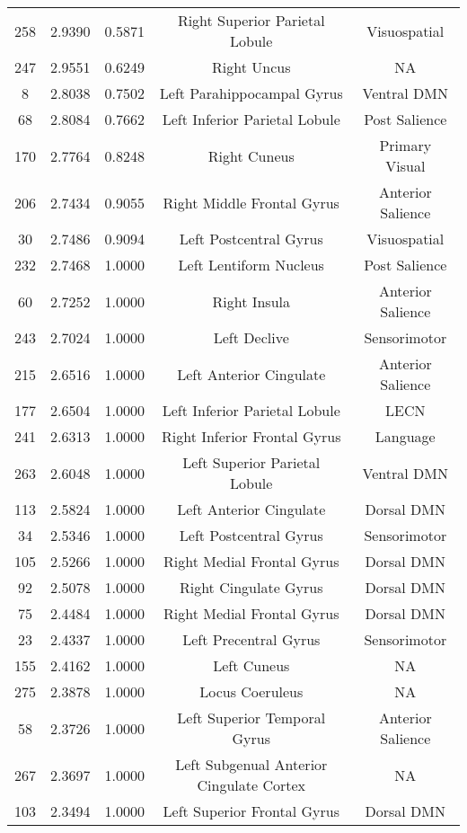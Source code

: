 \documentclass[10pt,letterpaper]{article}\usepackage[]{graphicx}\usepackage[]{color}
\begin{document}
\begin{center}
\begin{longtable}[c]{ccccc}
	258	& 2.9390 & 0.5871 & Right Superior Parietal Lobule & Visuospatial \\
	247	& 2.9551 & 0.6249 & Right Uncus & NA \\
	8	& 2.8038 & 0.7502 & Left Parahippocampal Gyrus & Ventral DMN \\
	68	& 2.8084 & 0.7662 & Left Inferior Parietal Lobule & Post Salience \\
	170	& 2.7764 & 0.8248 & Right Cuneus & Primary Visual \\
	206	& 2.7434 & 0.9055 & Right Middle Frontal Gyrus & Anterior Salience \\
	30	& 2.7486 & 0.9094 & Left Postcentral Gyrus & Visuospatial \\
	232	& 2.7468 & 1.0000 & Left Lentiform Nucleus & Post Salience \\      
	60	& 2.7252 & 1.0000 & Right Insula & Anterior Salience \\
	243	& 2.7024 & 1.0000 & Left Declive & Sensorimotor \\
	215	& 2.6516 & 1.0000 & Left Anterior Cingulate & Anterior Salience \\
	177	& 2.6504 & 1.0000 & Left Inferior Parietal Lobule & LECN \\
	241	& 2.6313 & 1.0000 & Right Inferior Frontal Gyrus & Language \\
	263	& 2.6048 & 1.0000 & Left Superior Parietal Lobule & Ventral DMN \\
	113	& 2.5824 & 1.0000 & Left Anterior Cingulate & Dorsal DMN \\
	34	& 2.5346 & 1.0000 & Left Postcentral Gyrus & Sensorimotor \\
	105	& 2.5266 & 1.0000 & Right Medial Frontal Gyrus & Dorsal DMN \\
	92	& 2.5078 & 1.0000 & Right Cingulate Gyrus & Dorsal DMN \\
	75	& 2.4484 & 1.0000 & Right Medial Frontal Gyrus & Dorsal DMN \\
	23	& 2.4337 & 1.0000 & Left Precentral Gyrus & Sensorimotor \\
	155	& 2.4162 & 1.0000 & Left Cuneus & NA \\
	275	& 2.3878 & 1.0000 & Locus Coeruleus & NA \\
	58	& 2.3726 & 1.0000 & Left Superior Temporal Gyrus & Anterior Salience \\
	267	& 2.3697 & 1.0000 & Left Subgenual Anterior Cingulate Cortex & NA \\
	103	& 2.3494 & 1.0000 & Left Superior Frontal Gyrus & Dorsal DMN \\

\end{longtable}
\end{center}
\end{document}
